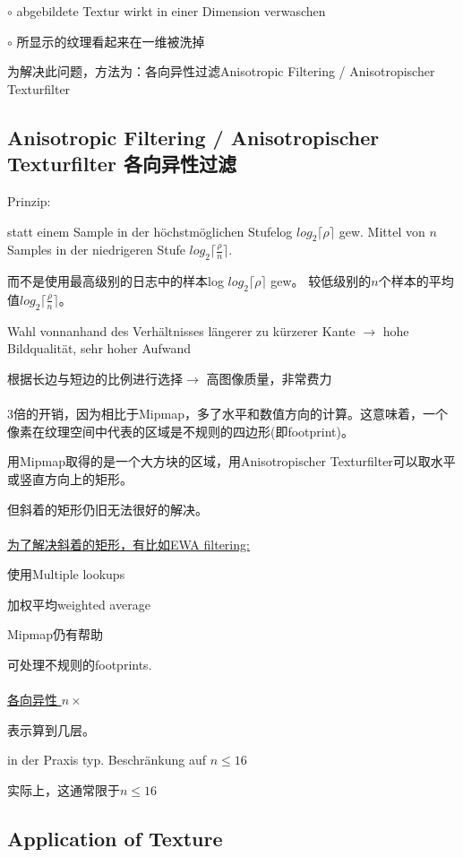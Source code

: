 \documentclass[fleqn]{article}
\begin{document}
$\circ$ abgebildete Textur wirkt in einer Dimension verwaschen

$\circ$ 所显示的纹理看起来在一维被洗掉



为解决此问题，方法为：各向异性过滤Anisotropic Filtering / Anisotropischer Texturfilter

\subsection{Anisotropic Filtering / Anisotropischer Texturfilter 各向异性过滤}

\noindent Prinzip: 

statt einem Sample in der höchstmöglichen Stufelog $log_2\lceil \rho\rceil$ gew. Mittel von $n$ Samples in der niedrigeren Stufe $log_2\lceil \frac{\rho}{n}\rceil$.

而不是使用最高级别的日志中的样本log $ log_2 \lceil \rho \rceil $ gew。 较低级别的$ n $个样本的平均值$ log_2 \lceil \frac {\rho} {n} \rceil $。

Wahl vonnanhand des Verhältnisses längerer zu kürzerer Kante $\rightarrow$
hohe Bildqualität, sehr hoher Aufwand

根据长边与短边的比例进行选择$\rightarrow$ 高图像质量，非常费力
\\
\\
\noindent 3倍的开销，因为相比于Mipmap，多了水平和数值方向的计算。这意味着，一个像素在纹理空间中代表的区域是不规则的四边形(即footprint)。

用Mipmap取得的是一个大方块的区域，用Anisotropischer Texturfilter可以取水平或竖直方向上的矩形。

但斜着的矩形仍旧无法很好的解决。
\\
\\
\underline{为了解决斜着的矩形，有比如EWA filtering:}

使用Multiple lookups

加权平均weighted average

Mipmap仍有帮助

可处理不规则的footprints.
\\
\\
\underline{各向异性 $n\times$}

表示算到几层。

in der Praxis typ. Beschränkung auf $n\leq16$

实际上，这通常限于$ n \leq16 $

\subsection{Application of Texture}
\end{document}
